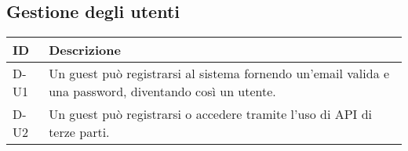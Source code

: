 \subsection*{Gestione degli utenti}

\begin{table}[H]
    \centering
    \renewcommand{\arraystretch}{1.3} %
    
    \begin{tabular}{|p{3cm}|p{10cm}|} 
        \hline
        \textbf{ID} & \textbf{Descrizione} \\  
        \hline
        D-U1 & Un guest può registrarsi al sistema fornendo un’email valida e una password, diventando così un utente. \\ 
        \hline
        D-U2 & Un guest può registrarsi o accedere tramite l’uso di API di terze parti. \\ 
        \hline
    \end{tabular}
    
\end{table}